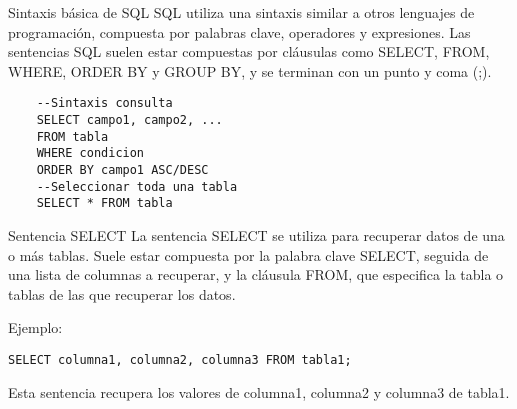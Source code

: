 \begin{frame}[fragile]{Sintaxis básica de SQL}
\protect\hypertarget{sintaxis-buxe1sica-de-sql}{}
SQL utiliza una sintaxis similar a otros lenguajes de programación,
compuesta por palabras clave, operadores y expresiones. Las sentencias
SQL suelen estar compuestas por cláusulas como SELECT, FROM, WHERE,
ORDER BY y GROUP BY, y se terminan con un punto y coma (;).

\begin{verbatim}
    --Sintaxis consulta
    SELECT campo1, campo2, ...
    FROM tabla
    WHERE condicion
    ORDER BY campo1 ASC/DESC
    --Seleccionar toda una tabla
    SELECT * FROM tabla
\end{verbatim}
\end{frame}

\begin{frame}[fragile]{Sentencia SELECT}
\protect\hypertarget{sentencia-select}{}
La sentencia SELECT se utiliza para recuperar datos de una o más tablas.
Suele estar compuesta por la palabra clave SELECT, seguida de una lista
de columnas a recuperar, y la cláusula FROM, que especifica la tabla o
tablas de las que recuperar los datos.

Ejemplo:

\texttt{SELECT\ columna1,\ columna2,\ columna3\ FROM\ tabla1;}

Esta sentencia recupera los valores de columna1, columna2 y columna3 de
tabla1.
\end{frame}

